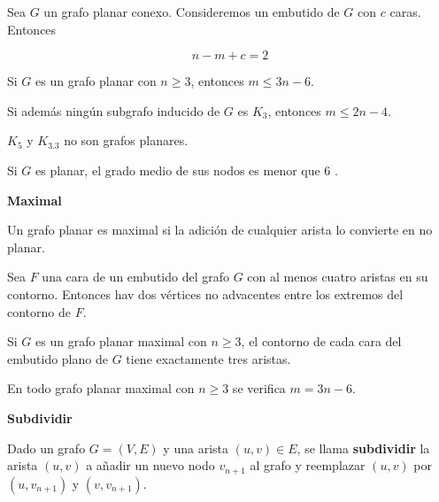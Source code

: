 \documentclass[openany]{book}
\begin{document}
\begin{theorem}
  Sea $G$ un grafo planar conexo. Consideremos un embutido de $G$ con $c$ caras. Entonces

  $$
  n-m+c=2
  $$

\end{theorem}

\begin{proposition}
  Si $G$ es un grafo planar con $n \geq 3$, entonces $m \leq 3 n-6$.

  Si además ningún subgrafo inducido de $G$ es $K_{3}$, entonces $m \leq 2 n-4$.
\end{proposition}

\begin{proposition}
  $K_{5}$ y $K_{3.3}$ no son grafos planares.
\end{proposition}

\begin{proposition}
  Si $G$ es planar, el grado medio de sus nodos es menor que 6 .
\end{proposition}


\begin{definition}
  { \color{turquoise} \textbf{Maximal}}


  Un grafo planar es maximal si la adición de cualquier arista lo convierte en no planar.

\end{definition}


\begin{proposition}
  Sea $F$ una cara de un embutido del grafo $G$ con al menos cuatro aristas en su contorno. Entonces hav dos vértices no advacentes entre los extremos del contorno de $F$.

\end{proposition}

\begin{proposition}
  Si $G$ es un grafo planar maximal con $n \geq 3$, el contorno de cada cara del embutido plano de $G$ tiene exactamente tres aristas.

\end{proposition}

\begin{proposition}
  En todo grafo planar maximal con $n \geq 3$ se verifica $m=3 n-6$.

\end{proposition}


\begin{definition}
  { \color{turquoise} \textbf{Subdividir}}

  Dado un grafo $G=(V, E)$ y una arista $(u, v) \in E$, se llama \textbf{subdividir} la arista $(u, v)$ a añadir un nuevo nodo $v_{n+1}$ al grafo y reemplazar $(u, v)$ por $\left(u, v_{n+1}\right)$ y $\left(v, v_{n+1}\right)$.

\end{definition}
\end{document}
